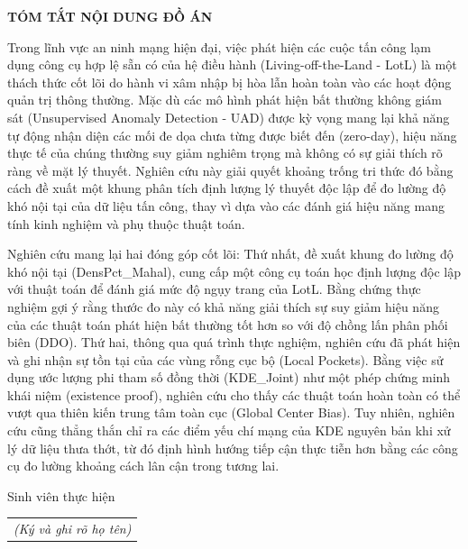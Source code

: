 \documentclass[../main.tex]{subfiles}
\begin{document}
\begin{center}
    \Large{\textbf{TÓM TẮT NỘI DUNG ĐỒ ÁN}}\\
\end{center}
\vspace{0.5cm}

Trong lĩnh vực an ninh mạng hiện đại, việc phát hiện các cuộc tấn công lạm dụng công cụ hợp lệ sẵn có của hệ điều hành (Living-off-the-Land - LotL) là một thách thức cốt lõi do hành vi xâm nhập bị hòa lẫn hoàn toàn vào các hoạt động quản trị thông thường. Mặc dù các mô hình phát hiện bất thường không giám sát (Unsupervised Anomaly Detection - UAD) được kỳ vọng mang lại khả năng tự động nhận diện các mối đe dọa chưa từng được biết đến (zero-day), hiệu năng thực tế của chúng thường suy giảm nghiêm trọng mà không có sự giải thích rõ ràng về mặt lý thuyết. Nghiên cứu này giải quyết khoảng trống tri thức đó bằng cách đề xuất một khung phân tích định lượng lý thuyết độc lập để đo lường độ khó nội tại của dữ liệu tấn công, thay vì dựa vào các đánh giá hiệu năng mang tính kinh nghiệm và phụ thuộc thuật toán.

Nghiên cứu mang lại hai đóng góp cốt lõi: Thứ nhất, đề xuất khung đo lường độ khó nội tại (DensPct\_Mahal), cung cấp một công cụ toán học định lượng độc lập với thuật toán để đánh giá mức độ ngụy trang của LotL. Bằng chứng thực nghiệm gợi ý rằng thước đo này có khả năng giải thích sự suy giảm hiệu năng của các thuật toán phát hiện bất thường tốt hơn so với độ chồng lấn phân phối biên (DDO). Thứ hai, thông qua quá trình thực nghiệm, nghiên cứu đã phát hiện và ghi nhận sự tồn tại của các vùng rỗng cục bộ (Local Pockets). Bằng việc sử dụng ước lượng phi tham số đồng thời (KDE\_Joint) như một phép chứng minh khái niệm (existence proof), nghiên cứu cho thấy các thuật toán hoàn toàn có thể vượt qua thiên kiến trung tâm toàn cục (Global Center Bias). Tuy nhiên, nghiên cứu cũng thẳng thắn chỉ ra các điểm yếu chí mạng của KDE nguyên bản khi xử lý dữ liệu thưa thớt, từ đó định hình hướng tiếp cận thực tiễn hơn bằng các công cụ đo lường khoảng cách lân cận trong tương lai.

\begin{flushright}
Sinh viên thực hiện\\
\begin{tabular}{@{}c@{}}
\textit{(Ký và ghi rõ họ tên)}
\end{tabular}
\end{flushright}
\end{document}
